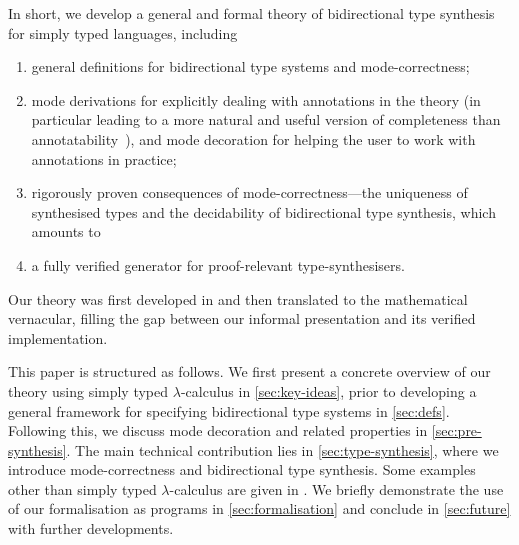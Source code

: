 %
In short, we develop a general and formal theory of bidirectional type synthesis for simply typed languages, including 
\begin{enumerate}
  \item general definitions for bidirectional type systems and mode-correctness;
  \item mode derivations for explicitly dealing with annotations in the theory (in particular leading to a more natural and useful version of completeness than annotatability~\cite{Dunfield2021}), and mode decoration for helping the user to work with annotations in practice;
  \item rigorously proven consequences of mode-correctness---the uniqueness of synthesised types and the decidability of bidirectional type synthesis, which amounts to
  \item a fully verified generator for proof-relevant type-synthesisers.
\end{enumerate}
Our theory was first developed in \Agda and then translated to the mathematical vernacular, filling the gap between our informal presentation and its verified implementation.


This paper is structured as follows.
We first present a concrete overview of our theory using simply typed $\lambda$-calculus in \cref{sec:key-ideas}, prior to developing a general framework for specifying bidirectional type systems in \cref{sec:defs}.
Following this, we discuss mode decoration and related properties in \cref{sec:pre-synthesis}.
The main technical contribution lies in \cref{sec:type-synthesis}, where we introduce mode-correctness and bidirectional type synthesis.
Some examples other than simply typed $\lambda$-calculus are given in .
We briefly demonstrate the use of our \Agda formalisation as programs in \cref{sec:formalisation} and conclude in \cref{sec:future} with further developments.


